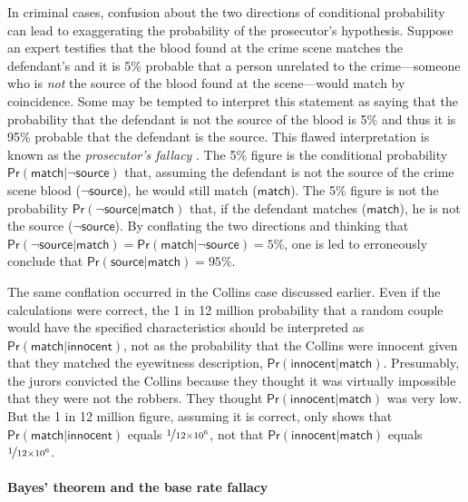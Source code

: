 \documentclass{article}
\newcommand{\pr}{\mathsf{Pr}}
\begin{document}
In criminal cases, confusion about the two directions of conditional probability can lead to exaggerating the probability of the prosecutor's hypothesis.   Suppose an expert testifies that the blood found at the crime scene matches the defendant's and it is 5\% probable that a person unrelated to the crime---someone who is \textit{not} the source of the blood found at the  scene---would match by coincidence. Some may be tempted to interpret this statement as saying that the probability  that the defendant is not the source of the blood  is 5\% and thus it is  95\% probable that the defendant is the source. This flawed interpretation  is known as the \textit{prosecutor's fallacy} \citep{thompson1987interpretation}. 
The 5\% figure is the conditional probability $\pr(\textsf{match} \vert \neg \textsf{source})$ that, assuming the defendant is not the source of the crime scene blood ($\neg \textsf{source}$), he would still match ($\textsf{match}$). The 5\% figure is not the probability $\pr(\neg \textsf{source} \vert \textsf{match})$ that, if the defendant matches ($\textsf{match}$), he is not the source ($\neg \textsf{source}$). %
By  conflating the two directions and thinking that $\pr(\neg \textsf{source} \vert \textsf{match})=\pr(\textsf{match} \vert \neg \textsf{source})=5\%$, one is led to erroneously  conclude that $\pr (\textsf{source} | \textsf{match})=95\%$. 


The same conflation occurred in the Collins case discussed earlier. Even if the calculations were correct, the 1 in 12 million probability that a random couple would have the specified characteristics should be interpreted as 
$\pr(\textsf{match}\vert \textsf{innocent})$, not as the probability that the Collins were innocent given that they matched the eyewitness description, $\pr(\textsf{innocent}\vert \textsf{match})$. Presumably, the jurors convicted the Collins because they thought it was virtually impossible that they were not the robbers. They thought  
$\pr(\textsf{innocent}\vert \textsf{match})$ was very low. 
But the 1 in 12 
million figure, assuming it is correct, only shows that \linebreak  $\pr(\textsf{match}\vert \textsf{innocent})$ equals $\nicefrac{1}{12\times 10^6}$, not that $\pr(\textsf{innocent}\vert \textsf{match})$ equals $\nicefrac{1}{12\times 10^6}$.




\paragraph{Bayes' theorem and the base rate fallacy}\label{subsec:BT}
\end{document}
